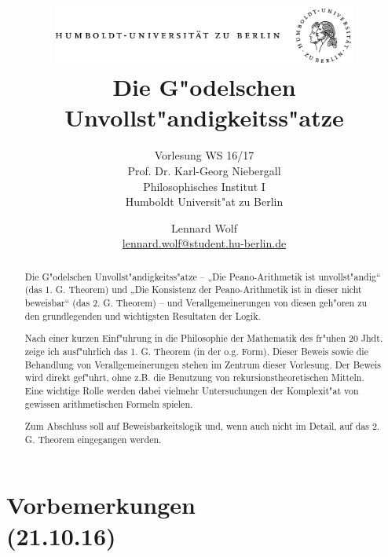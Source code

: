 \documentclass[]{scrartcl}
\begin{document}
\title{
	\includegraphics*[width=0.75\textwidth]{images/hu_logo.png}\\
	\vspace{24pt}
	Die G"odelschen Unvollst"andigkeitss"atze}
\subtitle{Vorlesung WS 16/17\\
          Prof. Dr. Karl-Georg Niebergall\\
          Philosophisches Institut I \\ 
          Humboldt Universit"at zu Berlin}
\author{Lennard Wolf\\
        \href{mailto:lennard.wolf@student.hu-berlin.de}{lennard.wolf@student.hu-berlin.de}}
\maketitle
\begin{abstract}

Die G"odelschen Unvollst"andigkeitss"atze – „Die Peano-Arithmetik ist unvollst"andig“ (das 1. G. Theorem) und „Die Konsistenz der Peano-Arithmetik ist in dieser nicht beweisbar“ (das 2. G. Theorem) – und Verallgemeinerungen von diesen geh"oren zu den grundlegenden und wichtigsten Resultaten der Logik. 

Nach einer kurzen Einf"uhrung in die Philosophie der Mathematik des fr"uhen 20 Jhdt. zeige ich ausf"uhrlich das 1. G. Theorem (in der o.g. Form). Dieser Beweis sowie die Behandlung von Verallgemeinerungen stehen im Zentrum dieser Vorlesung. Der Beweis wird direkt gef"uhrt, ohne 
z.B. die Benutzung von rekursionstheoretischen Mitteln. Eine wichtige Rolle werden dabei vielmehr Untersuchungen der Komplexit"at von gewissen arithmetischen Formeln spielen. 

Zum Abschluss soll auf Beweisbarkeitslogik und, wenn auch nicht im Detail, auf das 2. G. Theorem eingegangen werden.

\end{abstract}
\newpage

\tableofcontents
\listoffigures
\newpage


\section{Vorbemerkungen\\(21.10.16)}
\end{document}
